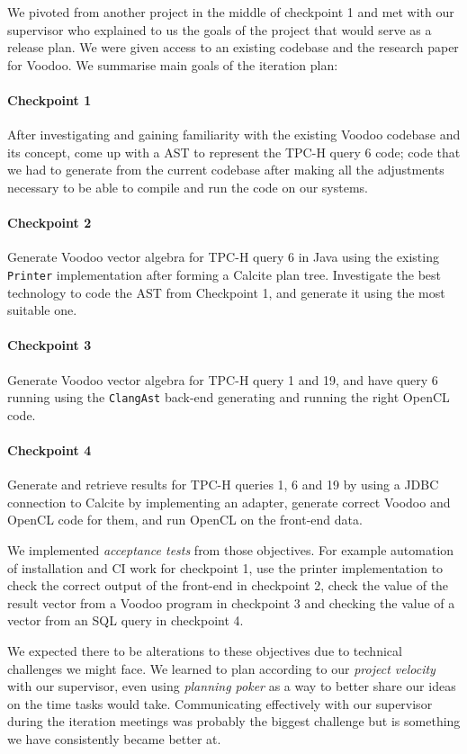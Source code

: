 We pivoted from another project in the middle of checkpoint 1 and met with our supervisor who explained to us the goals of the project that would serve as a release plan. We were given access to an existing codebase and the research paper for Voodoo. We summarise main goals of the iteration plan:

\paragraph{Checkpoint 1} 
After investigating and gaining familiarity with the existing Voodoo codebase and its concept, come up with a AST to represent the TPC-H query 6 code; code that we had to generate from the current codebase after making all the adjustments necessary to be able to compile and run the code on our systems.

\paragraph{Checkpoint 2}
Generate Voodoo vector algebra for TPC-H query 6 in Java using the existing \texttt{Printer} implementation after forming a Calcite plan tree. Investigate the best technology to code the AST from Checkpoint 1, and generate it using the most suitable one.

\paragraph{Checkpoint 3}
Generate Voodoo vector algebra for TPC-H query 1 and 19, and have query 6 running using the \texttt{ClangAst} back-end generating and running the right OpenCL code.

\paragraph{Checkpoint 4}
Generate and retrieve results for TPC-H queries 1, 6 and 19 by using a JDBC connection to Calcite by implementing an adapter, generate correct Voodoo and OpenCL code for them, and run OpenCL on the front-end data.

We implemented \emph{acceptance tests} from those objectives. For example automation of installation and CI work for checkpoint 1, use the printer implementation to check the correct output of the front-end in checkpoint 2, check the value of the result vector from a Voodoo program in checkpoint 3 and checking the value of a vector from an SQL query in checkpoint 4.

We expected there to be alterations to these objectives due to technical challenges we might face. We learned to plan according to our \emph{project velocity} with our supervisor, even using \emph{planning poker} as a way to better share our ideas on the time tasks would take. Communicating effectively with our supervisor during the iteration meetings was probably the biggest challenge but is something we have consistently became better at.

